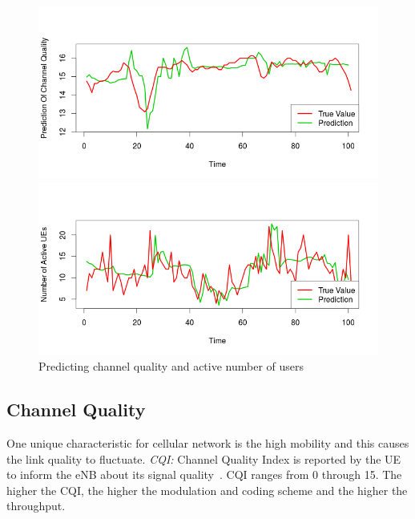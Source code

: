 \begin{figure}[t]

\begin{minipage} {\linewidth}
\centering
 \includegraphics[width=\linewidth]{pictures/prediction.png}
\end{minipage}
\hspace{0.5cm}
\begin{minipage} {\linewidth}
\centering
 \includegraphics[width=\linewidth]{pictures/UE.png}
\end{minipage}

\caption{Predicting channel quality and active number of users} \label{fig:prediction}
\end{figure}

\subsection{Channel Quality}\label{subsec:CQ}
One unique characteristic for cellular network is the high mobility and this causes the link quality to fluctuate. 
\emph{CQI:} Channel Quality Index is reported by the UE to inform the eNB about its signal quality~\cite{cqi}.  CQI ranges from 0 through 15. The higher the CQI, the higher the modulation and coding scheme and the higher the throughput. 

